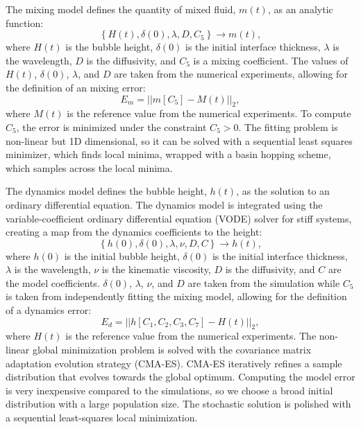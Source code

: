 The mixing model defines the quantity of mixed fluid, $m(t)$, as an analytic function:
\begin{equation}
\left\{H(t), \delta(0), \lambda, D, C_5\right\} \rightarrow m(t),
\end{equation}
where $H(t)$ is the bubble height, 
$\delta(0)$ is the initial interface thickness,
$\lambda$ is the wavelength,
$D$ is the diffusivity, and 
$C_5$ is a mixing coefficient.
The values of $H(t)$, $\delta(0)$, $\lambda$, and $D$ are taken from the numerical experiments, allowing for the definition of an mixing error:
\begin{equation}
E_m = \left|\left|m\left[C_5\right] - M(t) \right| \right|_2,
\end{equation}
where $M(t)$ is the reference value from the numerical experiments.
To compute $C_5$, the error is minimized under the constraint $C_5 > 0$.
The fitting problem is non-linear but 1D dimensional, so it can be solved with a sequential least squares minimizer, which finds local minima, wrapped with a basin hopping scheme, which samples across the local minima.

The dynamics model defines the bubble height, $h(t)$, as the solution to an ordinary differential equation.
The dynamics model is integrated using the variable-coefficient ordinary differential equation (VODE) solver for stiff systems, creating a map from the dynamics coefficients to the height:
\begin{equation}
\left\{h(0), \delta(0), \lambda, \nu, D, C\right\} \rightarrow h(t),
\end{equation}
where $h(0)$ is the initial bubble height,
$\delta(0)$ is the initial interface thickness,
$\lambda$ is the wavelength,
$\nu$ is the kinematic viscosity,
$D$ is the diffusivity, and
$C$ are the model coefficients.
$\delta(0)$, $\lambda$, $\nu$, and $D$ are taken from the simulation while $C_5$ is taken from independently fitting the mixing model, allowing for the definition of a dynamics error:
\begin{equation}
E_d = \left| \left| h\left[C_1, C_2, C_3, C_7\right] - H(t)\right| \right|_2,
\end{equation}
where $H(t)$ is the reference value from the numerical experiments.
The non-linear global minimization problem is solved with the covariance matrix adaptation evolution strategy (CMA-ES).
CMA-ES iteratively refines a sample distribution that evolves towards the global optimum.
Computing the model error is very inexpensive compared to the simulations, so we choose a broad initial distribution with a large population size.
The stochastic solution is polished with a sequential least-squares local minimization.

